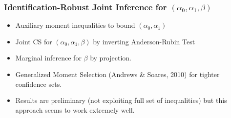 \documentclass{beamer}
\begin{document}
%
%    
%
%
\begin{frame}
  \frametitle{Identification-Robust Joint Inference for $(\alpha_0, \alpha_1, \beta)$}
  \begin{itemize}
    \item Auxiliary moment inequalities to bound $(\alpha_0, \alpha_1)$
    \item Joint CS for $(\alpha_0, \alpha_1, \beta)$ by inverting Anderson-Rubin Test 
    \item Marginal inference for $\beta$ by projection.
    \item Generalized Moment Selection (Andrews \& Soares, 2010) for tighter confidence sets.
    \item Results are preliminary (not exploiting full set of inequalities) but this approach seems to work extremely well. 
  \end{itemize}
\end{frame}
\end{document}
